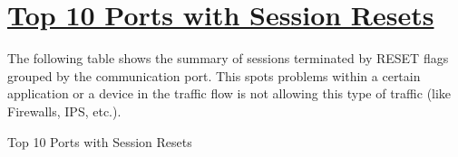 %
%
%

\chapter[Top 10 Ports with Session Resets]{\underline{Top 10 Ports with Session Resets}}
\begin{flushleft}
The following table shows the summary of sessions terminated by RESET flags grouped by the communication port. This spots problems within a certain application or a device in the traffic flow is not allowing this type of traffic (like Firewalls, IPS, etc.).
\end{flushleft}
\begin{table}[h]
  \begin{center}
    \caption[\normalsize{Top 10 Ports with Session Resets}]{\small{Top 10 Ports with Session Resets}}
  \end{center}
\end{table}

